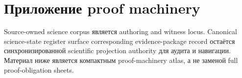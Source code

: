 \section{Приложение proof machinery}
\label{sec:oc13-proof-machinery-appendix-ru}

Source-owned science corpus является authoring and witness locus. Canonical
science-state register surface
corresponding evidence-package record
остаётся синхронизированной scientific projection authority для аудита и
навигации. Материал ниже является компактным proof-machinery atlas, а не
заменой full proof-obligation sheets.

\begingroup
\footnotesize
\RaggedRight
\sloppy
\setlength{\tabcolsep}{2pt}
\setlength{\LTleft}{0pt}
\setlength{\LTright}{0pt}

\endgroup
